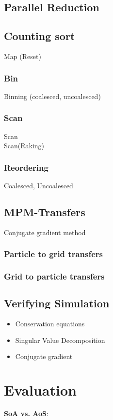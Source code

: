 \documentclass[m,times]{cgMA}
\begin{document}
\subsection{Parallel Reduction}
\cite{NVIDIA:PARALLEL_REDUCTION}
\subsection{Counting sort}
Map (Reset) \\
\subsubsection{Bin}
Binning\cite{NVIDIA:BINNING} (coalesced, uncoalesced)\\
\subsubsection{Scan}
Scan\cite{NVIDIA:SCAN}\\
Scan(Raking) \cite{NVIDIA:SCAN_MODERN}
\subsubsection{Reordering}
Coalesced, Uncoalesced
\subsection{MPM-Transfers}
Conjugate gradient method
\subsubsection{Particle to grid transfers}
\subsubsection{Grid to particle transfers}
\subsection{Verifying Simulation}
\begin{itemize}
  \item Conservation equations
    \cite{MPM:APIC}
  \item Singular Value Decomposition
  \item Conjugate gradient
\end{itemize}
\clearpage
\section{Evaluation}
\textbf{SoA vs. AoS}:
\end{document}
